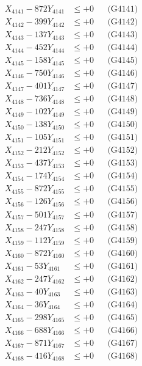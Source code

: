 \documentclass[a4paper,10pt]{article}
\begin{document}
{\begin{align}
\allowbreak
X_{4141} - 872Y_{4141} &\leq +0 && \text{(G4141)} \\
X_{4142} - 399Y_{4142} &\leq +0 && \text{(G4142)} \\
X_{4143} - 137Y_{4143} &\leq +0 && \text{(G4143)} \\
X_{4144} - 452Y_{4144} &\leq +0 && \text{(G4144)} \\
X_{4145} - 158Y_{4145} &\leq +0 && \text{(G4145)} \\
X_{4146} - 750Y_{4146} &\leq +0 && \text{(G4146)} \\
X_{4147} - 401Y_{4147} &\leq +0 && \text{(G4147)} \\
X_{4148} - 736Y_{4148} &\leq +0 && \text{(G4148)} \\
X_{4149} - 102Y_{4149} &\leq +0 && \text{(G4149)} \\
X_{4150} - 138Y_{4150} &\leq +0 && \text{(G4150)} \\
\allowbreak
X_{4151} - 105Y_{4151} &\leq +0 && \text{(G4151)} \\
X_{4152} - 212Y_{4152} &\leq +0 && \text{(G4152)} \\
X_{4153} - 437Y_{4153} &\leq +0 && \text{(G4153)} \\
X_{4154} - 174Y_{4154} &\leq +0 && \text{(G4154)} \\
X_{4155} - 872Y_{4155} &\leq +0 && \text{(G4155)} \\
X_{4156} - 126Y_{4156} &\leq +0 && \text{(G4156)} \\
X_{4157} - 501Y_{4157} &\leq +0 && \text{(G4157)} \\
X_{4158} - 247Y_{4158} &\leq +0 && \text{(G4158)} \\
X_{4159} - 112Y_{4159} &\leq +0 && \text{(G4159)} \\
X_{4160} - 872Y_{4160} &\leq +0 && \text{(G4160)} \\
\allowbreak
X_{4161} - 53Y_{4161} &\leq +0 && \text{(G4161)} \\
X_{4162} - 247Y_{4162} &\leq +0 && \text{(G4162)} \\
X_{4163} - 40Y_{4163} &\leq +0 && \text{(G4163)} \\
X_{4164} - 36Y_{4164} &\leq +0 && \text{(G4164)} \\
X_{4165} - 298Y_{4165} &\leq +0 && \text{(G4165)} \\
X_{4166} - 688Y_{4166} &\leq +0 && \text{(G4166)} \\
X_{4167} - 871Y_{4167} &\leq +0 && \text{(G4167)} \\
X_{4168} - 416Y_{4168} &\leq +0 && \text{(G4168)} \\

\end{align}}
\end{document}
